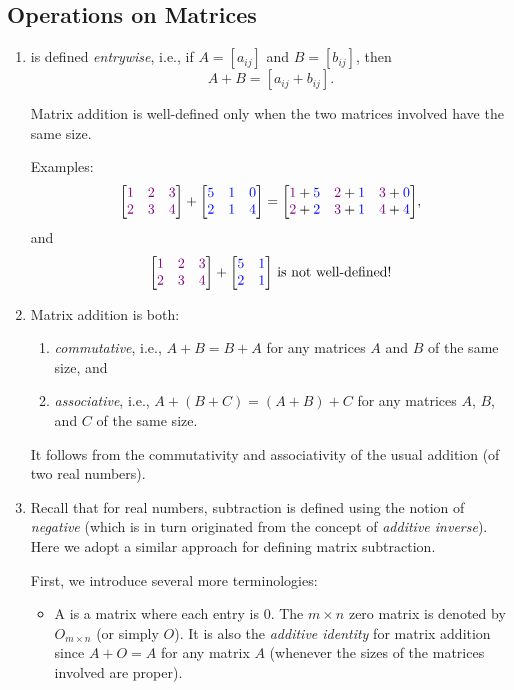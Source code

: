 \subsection{Operations on Matrices}
\label{subsect:matrix-operations}
\begin{enumerate}
\item {} is defined \emph{entrywise}, i.e., if
\(A=[a_{ij}]\) and \(B=[b_{ij}]\), then
\[
A+B=[a_{ij}+b_{ij}].
\]
\begin{note}
Matrix addition is well-defined only when the two matrices involved have the
same size.
\end{note}
Examples:
\[
\mqty[\vc{1}&\vc{2}&\vc{3}\\ \vc{2}&\vc{3}&\vc{4}]
+\mqty[\blc{5}&\blc{1}&\blc{0}\\ \blc{2}&\blc{1}&\blc{4}]
=
\mqty[\vc{1}+\blc{5}&\vc{2}+\blc{1}&\vc{3}+\blc{0}\\ \vc{2}+\blc{2}&\vc{3}+\blc{1}&\vc{4}+\blc{4}],
\]
and
\[
\mqty[\vc{1}&\vc{2}&\vc{3}\\ \vc{2}&\vc{3}&\vc{4}]
+\mqty[\blc{5}&\blc{1}\\ \blc{2}&\blc{1}]
\text{ is not well-defined!}
\]
\item \label{it:matrix-add-asso-comm}
Matrix addition is both: 
\begin{enumerate}
\item \emph{commutative}, i.e., \(A+B=B+A\) for any matrices \(A\) and \(B\) of
the same size, and
\item \emph{associative}, i.e., \(A+(B+C)=(A+B)+C\) for any matrices \(A\),
\(B\), and \(C\) of the same size.
\end{enumerate}
\begin{pf}
It follows from the commutativity and associativity of the usual addition (of
two real numbers).
\end{pf}

\item Recall that for real numbers, subtraction is defined using the notion of
\emph{negative} (which is in turn originated from the concept of \emph{additive
inverse}). Here we adopt a similar approach for defining matrix subtraction.

First, we introduce several more terminologies:
\begin{itemize}
\item A  is a matrix where each entry is \(0\). The \(m\times
n\) zero matrix is denoted by \(O_{m\times n}\) (or simply \(O\)). It is also
the \emph{additive identity} for matrix addition since \(A+O=A\) for any matrix
\(A\) (whenever the sizes of the matrices involved are proper).


\end{itemize}
\end{enumerate}
